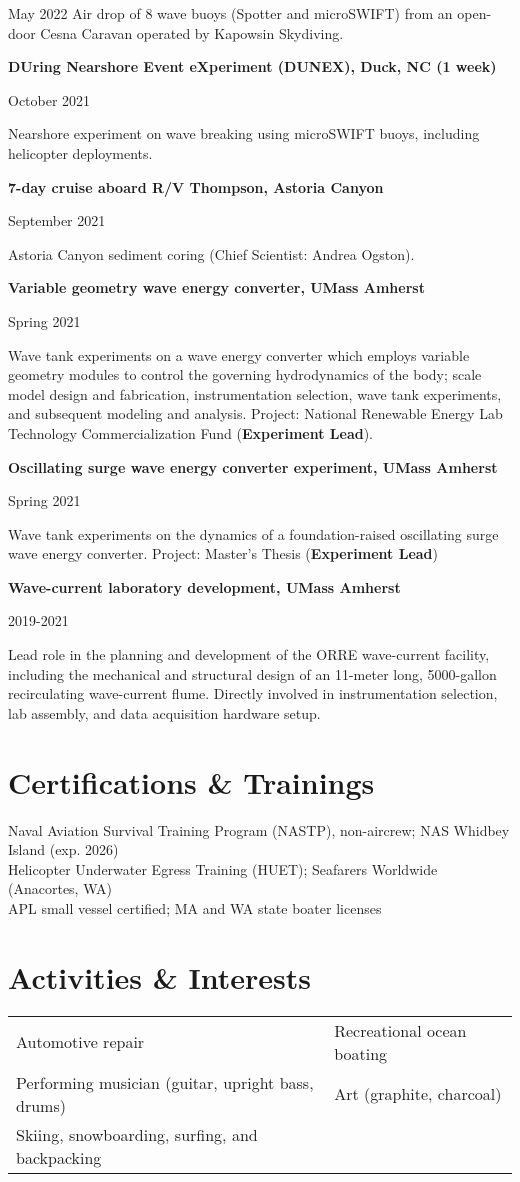 \documentclass[letterpaper,11pt]{article}
\newenvironment{indentPar}[1]{
  \justifying
  \begin{list}{}{\setlength{\leftmargin}{#1}}%
  \item[]
}
{\end{list}}
\newcommand{\fieldExpEntry}[3]{
  \begin{minipage}[t]{.75\textwidth}
    \begin{flushleft}
      \textbf{#1}
    \end{flushleft}
    \end{minipage}%
    \hfill%
    \begin{minipage}[t]{.23\textwidth}
      \begin{flushright}
        #2%
      \end{flushright}%
    \end{minipage}%
    \vspace{-8pt}%
    \begin{indentPar}{0.5cm}%
      #3%
    \end{indentPar}%
    \vspace{-5pt}%
}
\begin{document}
  {May 2022}
  {Air drop of 8 wave buoys (Spotter and microSWIFT) from an open-door Cesna Caravan operated by Kapowsin Skydiving.}
%
\fieldExpEntry
  {DUring Nearshore Event eXperiment (DUNEX), Duck, NC (1 week)}{October 2021} 
  {Nearshore experiment on wave breaking using microSWIFT buoys, including helicopter deployments.} %
%
\fieldExpEntry
  {7-day cruise aboard R/V Thompson, Astoria Canyon}{September 2021}
  {Astoria Canyon sediment coring (Chief Scientist: Andrea Ogston).}
%
\fieldExpEntry
  {Variable geometry wave energy converter, UMass Amherst}{Spring 2021}
  {Wave tank experiments on a wave energy converter which employs variable geometry modules to control the governing hydrodynamics of the body; scale model design and fabrication, instrumentation selection, wave tank experiments, and subsequent modeling and analysis. Project: National Renewable Energy Lab Technology Commercialization Fund (\textbf{Experiment Lead}).}
%
\fieldExpEntry
  {Oscillating surge wave energy converter experiment, UMass Amherst}{Spring 2021}
  {Wave tank experiments on the dynamics of a foundation-raised oscillating surge wave energy converter. Project: Master's Thesis  (\textbf{Experiment Lead}) }%
%
\fieldExpEntry{Wave-current laboratory development, UMass Amherst}{2019-2021}{Lead role in the planning and development of the ORRE wave-current facility, including the mechanical and structural design of an 11-meter long, 5000-gallon recirculating wave-current flume. Directly involved in instrumentation selection, lab assembly, and data acquisition hardware setup.}

\section{Certifications \& Trainings}
\vspace{-1pt}
Naval Aviation Survival Training Program (NASTP), non-aircrew; NAS Whidbey Island (exp. 2026)\\
Helicopter Underwater Egress Training (HUET); Seafarers Worldwide (Anacortes, WA)\\
APL small vessel certified; MA and WA state boater licenses
\vspace{-7pt}
\section{Activities \& Interests}
\vspace{-1pt}
\begin{tabular}
  {>{\raggedright\arraybackslash}p{}%
   >{\raggedright\arraybackslash}p{}%
  }
Automotive repair & Recreational ocean boating \\
Performing musician (guitar, upright bass, drums) & Art (graphite, charcoal)\\
Skiing, snowboarding, surfing, and backpacking & %
\end{tabular}
\vspace{-7pt}
\end{document}

